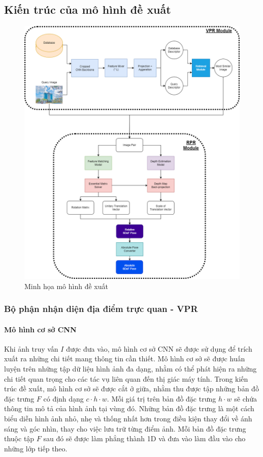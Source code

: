 \subsection{Kiến trúc của mô hình đề xuất}
\begin{figure}[H]
    \centering
    \includegraphics[scale=0.4]{pics/Proposal/models.png}
    \caption{Minh họa mô hình đề xuất}
\end{figure}

\subsubsection{Bộ phận nhận diện địa điểm trực quan - VPR}
\paragraph*{Mô hình cơ sở CNN}

Khi ảnh truy vấn $I$ được đưa vào, mô hình cơ sở CNN sẽ được sử dụng để trích xuất ra những chi tiết mang thông tin cần thiết. Mô hình cơ sở sẽ được huấn luyện trên những tập dữ liệu hình ảnh đa dạng, nhằm có thể phát hiện ra những chi tiết quan trọng cho các tác vụ liên quan đến thị giác máy tính. Trong kiến trúc đề xuất, mô hình cơ sở sẽ được cắt ở giữa, nhằm thu được tập những bản đồ đặc trưng $F$ có định dạng $c \cdot h \cdot w$. Mỗi giá trị trên bản đồ đặc trưng $h \cdot w$ sẽ chứa thông tin mô tả của hình ảnh tại vùng đó. Những bản đồ đặc trưng là một cách biểu diễn hình ảnh nhỏ, nhẹ và thống nhất hơn trong điều kiện thay đổi về ánh sáng và góc nhìn, thay cho việc lưu trữ từng điểm ảnh. Mỗi bản đồ đặc trưng thuộc tập $F$ sau đó sẽ được làm phẳng thành 1D và đưa vào làm đầu vào cho những lớp tiếp theo.


